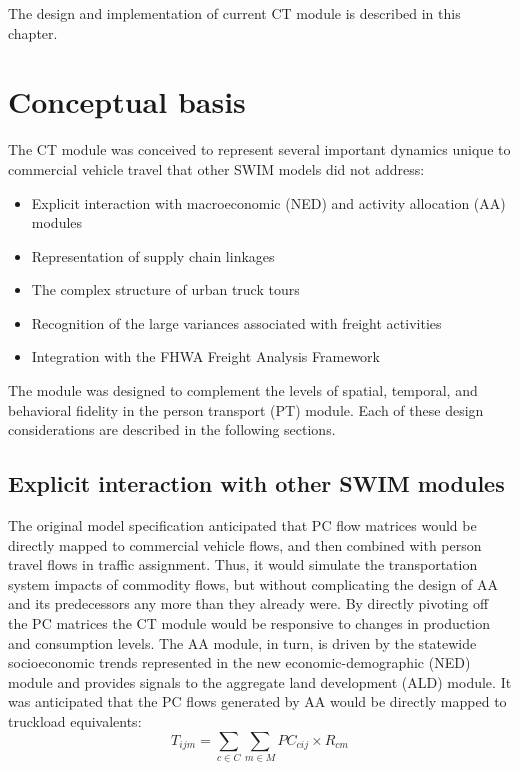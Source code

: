 \noindent The design and implementation of current CT module is described in this chapter.

\section{Conceptual basis}

The CT module was conceived to represent several important dynamics unique to commercial vehicle travel that other SWIM models did not address:
\begin{itemize}
    \item Explicit interaction with macroeconomic (NED) and activity allocation (AA) modules
    \item Representation of supply chain linkages
    \item The complex structure of urban truck tours
    \item Recognition of the large variances associated with freight activities
    \item Integration with the FHWA Freight Analysis Framework
\end{itemize}

The module was designed to complement the levels of spatial, temporal, and behavioral fidelity in the person transport (PT) module. Each of these design considerations are described in the following sections.

\subsection{Explicit interaction with other SWIM modules}\label{sec:ct-swim-integration}

The original model specification anticipated that PC flow matrices would be directly mapped to commercial vehicle flows, and then combined with person travel flows in traffic assignment. Thus, it would simulate the transportation system impacts of commodity flows, but without complicating the design of AA and its predecessors any more than they already were. By directly pivoting off the PC matrices the CT module would be responsive to changes in production and consumption levels. The AA module, in turn, is driven by the statewide socioeconomic trends represented in the new economic-demographic (NED) module and provides signals to the aggregate land development (ALD) module. It was anticipated that the PC flows generated by AA would be directly mapped to truckload equivalents:
\begin{equation}
\label{eq:direct-mapping}
T_{ijm} = \sum_{c \in C} \sum_{m \in M} PC_{cij} \times R_{cm}
\end{equation}

